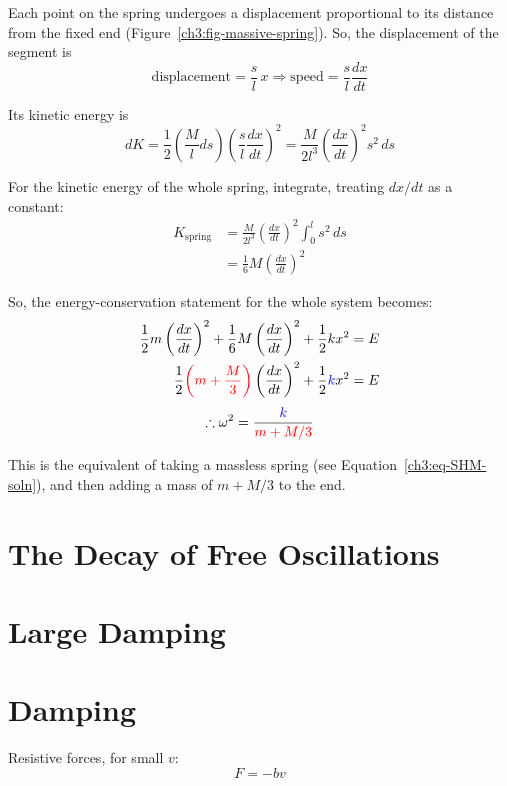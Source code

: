 \documentclass[11pt,letterpaper,titlepage,oneside]{book}
\newcommand{\kcol}[1]{\textcolor{blue}{#1}}
\newcommand{\mcol}[1]{\textcolor{red}{#1}}
\begin{document}
Each point on the spring undergoes a displacement proportional to its distance from the fixed end (Figure~\ref{ch3:fig-massive-spring}). So, the displacement of the segment is
\[ \text{displacement} = \frac{s}{l} \, x \Longrightarrow
\text{speed} = \frac{s}{l} \frac{dx}{dt} 
\]

Its kinetic energy is \[ dK = \frac{1}{2}\left( \frac{M}{l} ds \right) \left( \frac{s}{l} \frac{dx}{dt} \right)^2 = \frac{M}{2l^3} \left( \frac{dx}{dt} \right)^2 s^2 \, ds \]

For the kinetic energy of the whole spring, integrate, treating $dx/dt$ as a constant:
\begin{align*}
K_\text{spring} &= \frac{M}{2l^3} \left( \frac{dx}{dt} \right)^2  \int_0^{l} s^2 \, ds \\
&= \frac{1}{6}M\left(\frac{dx}{dt}\right)^2
\end{align*}

So, the energy-conservation statement for the whole system becomes:
\begin{align*}
\frac{1}{2}m\left(\frac{dx}{dt}\right)^2 + \frac{1}{6}M\left( \frac{dx}{dt}\right)^2 + \frac{1}{2}kx^2 &= E  \\
\frac{1}{2} \mcol{\left( m + \frac{M}{3} \right)} \left(\frac{dx}{dt}\right)^2 + \frac{1}{2} \kcol{k} x^2 &= E
\end{align*}
\[ \therefore \omega^2 = \frac{\kcol{k}}{\mcol{m+M/3}} \]

This is the equivalent of taking a massless spring (see Equation~\ref{ch3:eq-SHM-soln}), and then adding a mass of $m + M/3$ to the end.


\section{The Decay of Free Oscillations}

\section{Large Damping}


\section{Damping}
Resistive forces, for small $v$: \[ F=-bv \]
\end{document}
